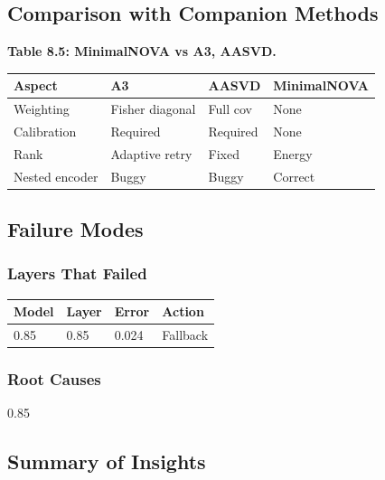 \subsection{Comparison with Companion Methods}

\textbf{Table 8.5: MinimalNOVA vs A3, AASVD.}

\begin{table}[H]
\centering
\small
\begin{tabular}{llll}
\toprule
\textbf{Aspect} & \textbf{A3} & \textbf{AASVD} & \textbf{MinimalNOVA} \\
\midrule
Weighting & Fisher diagonal & Full cov & None \\
Calibration & Required & Required & None \\
Rank & Adaptive retry & Fixed & Energy \\
Nested encoder & Buggy & Buggy & Correct \\
\bottomrule
\end{tabular}
\end{table}

\subsection{Failure Modes}

\subsubsection{Layers That Failed}

\begin{table}[H]
\centering
\small
\begin{tabular}{llll}
\toprule
\textbf{Model} & \textbf{Layer} & \textbf{Error} & \textbf{Action} \\
\midrule
0.85 & 0.85 & 0.024 & Fallback \\
\bottomrule
\end{tabular}
\end{table}

\subsubsection{Root Causes}

0.85

\subsection{Summary of Insights}

